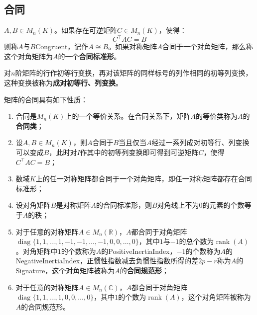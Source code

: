 \subsection{合同}
\begin{definition}
	$A,B\in M_{n}(K)$。如果存在可逆矩阵$C\in M_{n}(K)$，使得：
	\begin{equation*}
		C^{\top}AC=B
	\end{equation*}
	则称$A$与$B$\gls{Congruent}，记作$A\cong B$。如果对称矩阵$A$合同于一个对角矩阵，那么称这个对角矩阵为$A$的一个\textbf{合同标准形}。
\end{definition}
\begin{definition}
	对$n$阶矩阵的行作初等行变换，再对该矩阵的同样标号的列作相同的初等列变换，这种变换被称为\textbf{成对初等行、列变换}。
\end{definition}
\begin{property}\label{prop:CongruentMatrix}
	矩阵的合同具有如下性质：
	\begin{enumerate}
		\item 合同是$M_{n}(K)$上的一个等价关系。在合同关系下，矩阵$A$的等价类称为$A$的\textbf{合同类}；
		\item 设$A,B\in M_{n}(K)$，则$A$合同于$B$当且仅当$A$经过一系列成对初等行、列变换可以变成$B$，此时对$I$作其中的初等列变换即可得到可逆矩阵$C$，使得$C^{\top}AC=B$；
		\item 数域$K$上的任一对称矩阵都合同于一个对角矩阵，即任一对称矩阵都存在合同标准形；
		\item 设对角矩阵$B$是对称矩阵$A$的合同标准形，则$B$对角线上不为$0$的元素的个数等于$A$的秩；
		\item 对于任意的对称矩阵$A\in M_{n}(\mathbb{R})$，$A$都合同于对角矩阵\\$\operatorname{diag}\{1,1,\dots,1,-1,-1,\dots,-1,0,0,\dots,0\}$，其中$1$与$-1$的总个数为$\operatorname{rank}(A)$。对角矩阵中$1$的个数称为$A$的\gls{PositiveInertiaIndex}，$-1$的个数称为$A$的\gls{NegativeInertiaIndex}，正惯性指数减去负惯性指数所得的差$2p-r$称为$A$的\gls{Signature}，这个对角矩阵被称为$A$的\textbf{合同规范形}；
		\item 对于任意的对称矩阵$A\in M_{n}(\mathbb{C})$，$A$都合同于对角矩阵$\operatorname{diag}\{1,1,\dots,1,0,0,\dots,0\}$，其中$1$的个数为$\operatorname{rank}(A)$，这个对角矩阵被称为$A$的合同规范形。
	\end{enumerate}
\end{property}
